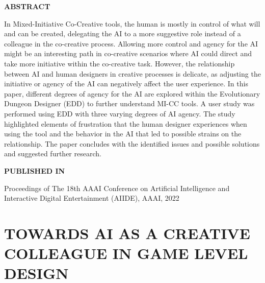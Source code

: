\graphicspath{{included-papers-tex/paper-13/}}



\normalfont
\textbf{\textsc{ABSTRACT}}

In Mixed-Initiative Co-Creative tools, the human is mostly in control of what will and can be created, delegating the AI to a more suggestive role instead of a colleague in the co-creative process. Allowing more control and agency for the AI might be an interesting path in co-creative scenarios where AI could direct and take more initiative within the co-creative task. However, the relationship between AI and human designers in creative processes is delicate, as adjusting the initiative or agency of the AI can negatively affect the user experience. In this paper, different degrees of agency for the AI are explored within the Evolutionary Dungeon Designer (EDD) to further understand MI-CC tools. A user study was performed using EDD with three varying degrees of AI agency. The study highlighted elements of frustration that the human designer experiences when using the tool and the behavior in the AI that led to possible strains on the relationship. The paper concludes with the identified issues and possible solutions and suggested further research.

\textbf{\textsc{PUBLISHED IN}}

Proceedings of The 18th AAAI Conference on Artificial Intelligence and Interactive Digital Entertainment (AIIDE), AAAI, 2022

\section*{TOWARDS AI AS A CREATIVE COLLEAGUE IN GAME LEVEL DESIGN}











